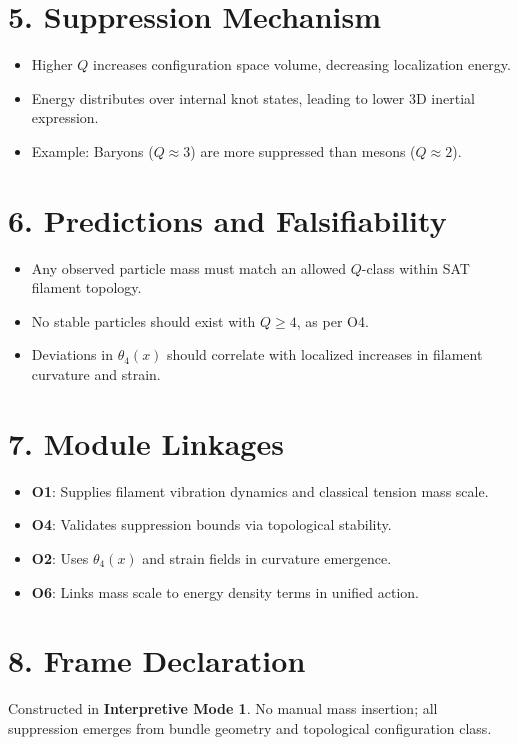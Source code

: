 \documentclass[12pt]{article}
\begin{document}
\section*{5. Suppression Mechanism}

\begin{itemize}
    \item Higher \( Q \) increases configuration space volume, decreasing localization energy.
    \item Energy distributes over internal knot states, leading to lower 3D inertial expression.
    \item Example: Baryons (\( Q \approx 3 \)) are more suppressed than mesons (\( Q \approx 2 \)).
\end{itemize}

\section*{6. Predictions and Falsifiability}

\begin{itemize}
    \item Any observed particle mass must match an allowed \( Q \)-class within SAT filament topology.
    \item No stable particles should exist with \( Q \geq 4 \), as per O4.
    \item Deviations in \(\theta_4(x)\) should correlate with localized increases in filament curvature and strain.
\end{itemize}

\section*{7. Module Linkages}

\begin{itemize}
    \item \textbf{O1}: Supplies filament vibration dynamics and classical tension mass scale.
    \item \textbf{O4}: Validates suppression bounds via topological stability.
    \item \textbf{O2}: Uses \(\theta_4(x)\) and strain fields in curvature emergence.
    \item \textbf{O6}: Links mass scale to energy density terms in unified action.
\end{itemize}

\section*{8. Frame Declaration}

Constructed in \textbf{Interpretive Mode 1}. No manual mass insertion; all suppression emerges from bundle geometry and topological configuration class.
\end{document}
